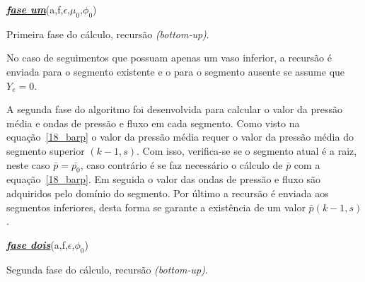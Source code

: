 \documentclass[
        english,			
        brazil			        %
        ,<...>]{abntbibufjf}
\begin{document}
\begin{algorithm}[H]
	\textbf{\textit{\textsl{\underline{fase um}}}}(a,f,$\epsilon$,$\mu_0$,$\phi_0$) \\
	\caption{Primeira fase do cálculo, recursão \textit{(bottom-up)}.}
\end{algorithm}

No caso de seguimentos que possuam apenas um vaso inferior, a recursão é enviada para o segmento existente e o para o segmento ausente se assume que $Y_e = 0$.

A segunda fase do algoritmo foi desenvolvida para calcular o valor da pressão média e ondas de pressão e fluxo em cada segmento. Como visto na equação~\eqref{18_barp} o valor da pressão média requer o valor da pressão média do segmento superior $(k-1,s)$. Com isso, verifica-se se o segmento atual é a raiz, neste caso $\bar{p} = \bar{p_0}$, caso contrário é se faz necessário o cálculo de $\bar{p}$ com a equação~\eqref{18_barp}. Em seguida o valor das ondas de pressão e fluxo são adquiridos pelo domínio do segmento. Por último a recursão é enviada aos segmentos inferiores, desta forma se garante a existência de um valor $\bar{p}(k-1,s)$.

\begin{algorithm}[H]
\textbf{\textit{\textsl{\underline{fase dois}}}}(a,f,$\epsilon$,$\phi_0$) \\
\caption{Segunda fase do cálculo, recursão \textit{(bottom-up)}.}
\end{algorithm}
\end{document}
